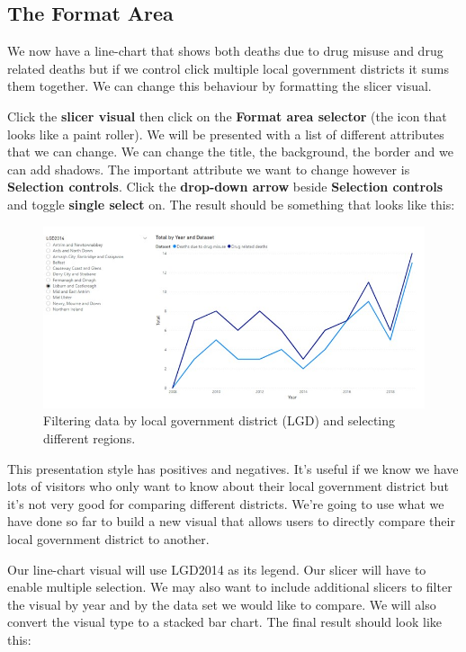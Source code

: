 \documentclass[
]{book}
\begin{document}
\hypertarget{the-format-area}{%
\subsection{The Format Area}\label{the-format-area}}

We now have a line-chart that shows both deaths due to drug misuse and drug related deaths but if we control click multiple local government districts it sums them together. We can change this behaviour by formatting the slicer visual.

Click the \textbf{slicer visual} then click on the \textbf{Format area selector} (the icon that looks like a paint roller). We will be presented with a list of different attributes that we can change. We can change the title, the background, the border and we can add shadows. The important attribute we want to change however is \textbf{Selection controls}. Click the \textbf{drop-down arrow} beside \textbf{Selection controls} and toggle \textbf{single select} on. The result should be something that looks like this:

\begin{figure}
\centering
\includegraphics{bi9.jpg}
\caption{Filtering data by local government district (LGD) and selecting different regions.}
\end{figure}

This presentation style has positives and negatives. It's useful if we know we have lots of visitors who only want to know about their local government district but it's not very good for comparing different districts. We're going to use what we have done so far to build a new visual that allows users to directly compare their local government district to another.

Our line-chart visual will use LGD2014 as its legend. Our slicer will have to enable multiple selection. We may also want to include additional slicers to filter the visual by year and by the data set we would like to compare. We will also convert the visual type to a stacked bar chart. The final result should look like this:
\end{document}
